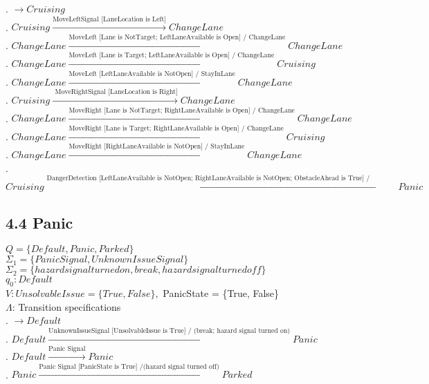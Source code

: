 \documentclass[12pt]{article}
\begin{document}
\begin{spacing}{1.5}
. $\rightarrow Cruising$\\
. $Cruising \xrightarrow {\text {MoveLeftSignal [LaneLocation is Left]}} ChangeLane$\\
. $ChangeLane \xrightarrow {\text {MoveLeft [Lane is NotTarget; LeftLaneAvailable is Open] / ChangeLane}} ChangeLane$\\
. $ChangeLane \xrightarrow {\text {MoveLeft [Lane is Target; LeftLaneAvailable is Open] / ChangeLane}} Cruising$\\
. $ChangeLane \xrightarrow {\text {MoveLeft [LeftLaneAvailable  is NotOpen] / StayInLane}} ChangeLane$\\
. $Cruising \xrightarrow {\text { MoveRightSignal [LaneLocation is Right]}} ChangeLane$\\
. $ChangeLane \xrightarrow {\text {MoveRight [Lane is NotTarget; RightLaneAvailable is Open] / ChangeLane}} ChangeLane$\\
. $ChangeLane \xrightarrow {\text {MoveRight [Lane is Target; RightLaneAvailable is Open] / ChangeLane}} Cruising$\\
. $ChangeLane \xrightarrow {\text {MoveRight [RightLaneAvailable is NotOpen] / StayInLane}} ChangeLane$\\
. $Cruising \xrightarrow {\text {DangerDetection [LeftLaneAvailable is NotOpen; RightLaneAvailable is NotOpen; ObstacleAhead is True] / (PanicModeOn)}} Panic$\\



\subsection{4.4 Panic}

\noindent $Q = \{Default, Panic, Parked\}$\\
\noindent $\Sigma_1 = \{Panic Signal, UnknownIssueSignal\}$\\
\noindent $\Sigma_2 = \{hazard signal turned on, break, hazard signal turned off\}$\\
\noindent $q_0: Default$\\
\noindent $V: UnsolvableIssue = \{True, False\}, $ PanicState = \{True, False\}\\
\noindent $\Lambda$: Transition specifications\\

. $\rightarrow Default$\\
. $Default \xrightarrow {\text {UnknownIssueSignal [UnsolvableIssue is True] / (break; hazard signal turned on)}} Panic$\\
. $Default \xrightarrow {\text {Panic Signal}} Panic$\\
. $Panic \xrightarrow {\text {Panic Signal [PanicState is True] /(hazard signal turned off)}} Parked$\\



\end{spacing}
\end{document}
